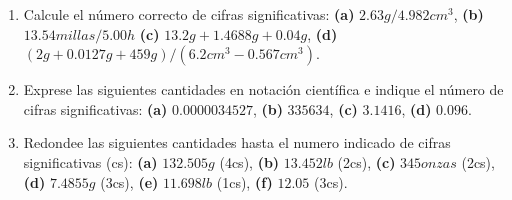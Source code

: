\documentclass{replab}
\begin{document}
	\begin{enumerate}
		\item Calcule el número correcto de cifras significativas: \textbf{(a)} $2.63g/4.982cm^3$, \textbf{(b)} $13.54millas/5.00h$ \textbf{(c)} $13.2g + 1.4688g + 0.04g$, \textbf{(d)} $(2g + 0.0127g + 459g)/(6.2cm^3-0.567cm^3)$.
		\item Exprese las siguientes cantidades en notación 	científica e indique el número de cifras significativas: \textbf{(a)} $0.0000034527$, \textbf{(b)} $335634$, \textbf{(c)} $3.1416$, \textbf{(d)} $0.096$.
		\item Redondee las siguientes cantidades hasta el numero indicado de cifras significativas (cs): \textbf{(a)} $132.505g$ (4cs), \textbf{(b)} $13.452lb$ (2cs), \textbf{(c)} $345onzas$ (2cs), \textbf{(d)} $7.4855g$ (3cs), \textbf{(e)} $11.698lb$ (1cs), \textbf{(f)} $12.05$ (3cs).
	\end{enumerate} 
	
	\printbibliography[heading=bibintoc]
	
\end{document}
